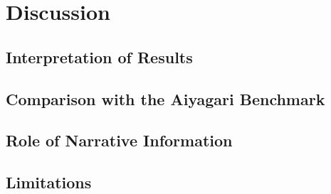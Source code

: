 
\chapter{Discussion}
\label{chap:discussion}


\section{Interpretation of Results}
\label{sec:interpretation}


\section{Comparison with the Aiyagari Benchmark}
\label{sec:aiyagari_comparison}


\section{Role of Narrative Information}
\label{sec:narrative_role}


\section{Limitations}
\label{sec:limitations}


\endinput

